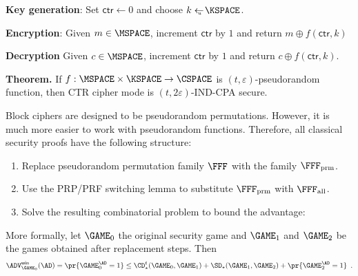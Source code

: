 \documentclass[landscape,footrule]{foils}
\newcommand{\lastline}{\vspace*{-2ex}}
\newcommand{\CTR}{\mathsf{ctr}}
\begin{document}


\begin{triangles}
  \item \textbf{Key generation}: Set $\CTR\gets 0$ and choose $k\getsu\KSPACE$.
  \item \textbf{Encryption}: Given $m\in\MSPACE$, increment $\CTR$ by $1$ and return $m\oplus f(\CTR,k)$
  \item \textbf{Decryption} Given $c\in\MSPACE$, increment $\CTR$ by $1$ and return $c\oplus f(\CTR,k)$.
\end{triangles}
\bigskip

\textbf{Theorem.} If $f:\MSPACE\times\KSPACE\to\CSPACE$ is
$(t,\varepsilon)$-pseudorandom function, then CTR cipher mode is
$(t,2\varepsilon)$-IND-CPA secure.\lastline




Block ciphers are designed to be pseudorandom permutations. However,
it is much more easier to work with pseudorandom
functions. Therefore, all classical security proofs have the following
structure:
\begin{enumerate}
\item Replace pseudorandom permutation family $\FFF$ with the family
  $\FFFPERM$.
\item Use the PRP/PRF switching lemma to substitute $\FFFPERM$ with $\FFFALL$.
\item Solve the resulting combinatorial problem to bound the  advantage:\vspace*{1ex}
\end{enumerate}\vspace*{2ex}

More formally, let $\GAME_0$ the original security game and $\GAME_1$
and $\GAME_2$ be the games obtained after replacement steps. Then
\begin{align*}
  \advWinXX{\GAME_0}{\AD}%
  =\pr{\smash{\GAME_0^\AD=1}}\leq\CD_\star^t(\GAME_0,\GAME_1)+\SD_\star(\GAME_1,\GAME_2)
  +\pr{\smash{\GAME_2^\AD=1}}\enspace.
\end{align*}
\end{document}
